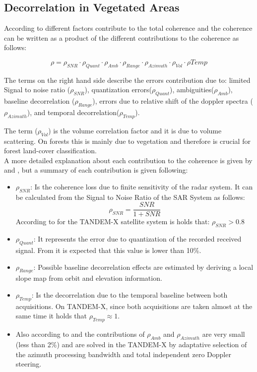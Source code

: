 \subsection{Decorrelation in Vegetated Areas}
According to \cite{Martone} different factors contribute to the total coherence and the coherence can be written as a product of the different contributions to the coherence as follows:

\begin{equation}
    \rho =\rho_{SNR}\cdot\rho_{Quant}\cdot\rho_{Amb}\cdot\rho_{Range}\cdot\rho_{Azimuth}\cdot\rho_{Vol}\cdot\rho{Temp}
\end{equation}

The terms on the right hand side describe the errors contribution due to: limited Signal to noise ratio ($\rho_{SNR}$), quantization errors($\rho_{Quant}$), ambiguities($\rho_{Amb}$),
baseline decorrelation 
($\rho_{Range}$), errors due to relative shift of the doppler spectra 
($\rho_{Azimuth}$), and temporal decorrelation($\rho_{Temp}$). 

The term ($\rho_{Vol}$) is the volume correlation factor and it is due to volume scattering. On forests this is mainly due to vegetation and therefore is crucial for forest land-cover classification.\\

A more detailed explanation about each contribution to the coherence is given by \cite{Martone2} and \cite{Rizzoli}, but a summary of each contribution is given following:

\begin{itemize}
    \item
    $\rho_{SNR}$: Is the coherence loss due to finite sensitivity of the radar system. It can be calculated from the Signal to Noise Ratio of the SAR System as follows:
    \begin{equation}
        \rho_{SNR}=\frac{SNR}{1+SNR}
    \end{equation}{}
    According to \cite{Martone3} for the TANDEM-X satellite system is holds that: \newline
    $\rho_{SNR}>0.8$
    \item
    $\rho_{Quant}$: It represents the error due to quantization of the recorded received signal. From \cite{Martone2} it is expected that this value is lower than 10\%.
    \item
    $\rho_{Range}$: Possible baseline decorrelation effects are estimated by deriving a local slope map from orbit and elevation information.
    \item
    $\rho_{Temp}$: Is the decorrelation due to the temporal baseline between both acquisitions. On TANDEM-X, since both acquisitions are taken almost at the same time it holds that $\rho_{Temp}\approx 1$.
    \item
    Also according to \cite{Martone3} and \cite{Krieger} the contributions of $\rho_{Amb}$ and $\rho_{Azimuth}$ are very small (less than 2\%) and are solved in the TANDEM-X by adaptative selection of the azimuth processing bandwidth and total independent zero Doppler steering.
\end{itemize}

